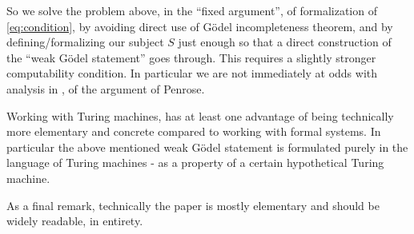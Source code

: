 \documentclass[9pt,twocolumn,twoside,lineno]{pnas-new}
\numberwithin{equation}{section}
\theoremstyle{definition}
\theoremstyle{remark}
\begin{document}
 
  So we solve the problem above, in the ``fixed argument'',  of formalization of \eqref{eq:condition}, by avoiding direct use of G\"odel incompleteness theorem, and by defining/formalizing our subject $S$ just enough so that a direct construction of the ``weak G\"odel statement'' goes through. This requires a slightly stronger computability condition. In particular we are not immediately at odds with analysis in \cite{citeKoellner2018-KOEOTQ-3}, \cite{citeKoellnerII2018-KOEOTQ-4} of the argument of Penrose.



Working with Turing machines, has at least one advantage of being technically
more
elementary and concrete compared to working with formal systems. In particular the above mentioned
weak G\"odel statement is formulated purely in the language
of Turing machines - as a property of a certain hypothetical Turing machine. 

As a final remark, technically the paper is mostly elementary and should be widely readable, in entirety.
\end{document}
